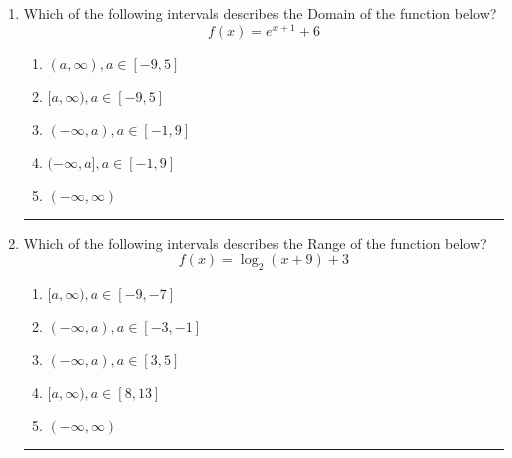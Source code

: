 \documentclass[14pt]{extbook}
\newcommand{\litem}[1]{\item#1\hspace*{-1cm}\rule{\textwidth}{0.4pt}}
\begin{document}
\begin{enumerate}
{\begin{enumerate}[label=\Alph*.]
\end{enumerate} }
\litem{
Which of the following intervals describes the Domain of the function below?\[ f(x) = e^{x+1}+6 \]\begin{enumerate}[label=\Alph*.]
\item \( (a, \infty), a \in [-9, 5] \)
\item \( [a, \infty), a \in [-9, 5] \)
\item \( (-\infty, a), a \in [-1, 9] \)
\item \( (-\infty, a], a \in [-1, 9] \)
\item \( (-\infty, \infty) \)

\end{enumerate} }
\litem{
Which of the following intervals describes the Range of the function below?\[ f(x) = \log_2{(x+9)}+3 \]\begin{enumerate}[label=\Alph*.]
\item \( [a, \infty), a \in [-9, -7] \)
\item \( (-\infty, a), a \in [-3, -1] \)
\item \( (-\infty, a), a \in [3, 5] \)
\item \( [a, \infty), a \in [8, 13] \)
\item \( (-\infty, \infty) \)

\end{enumerate} }
\end{enumerate}
\end{document}
